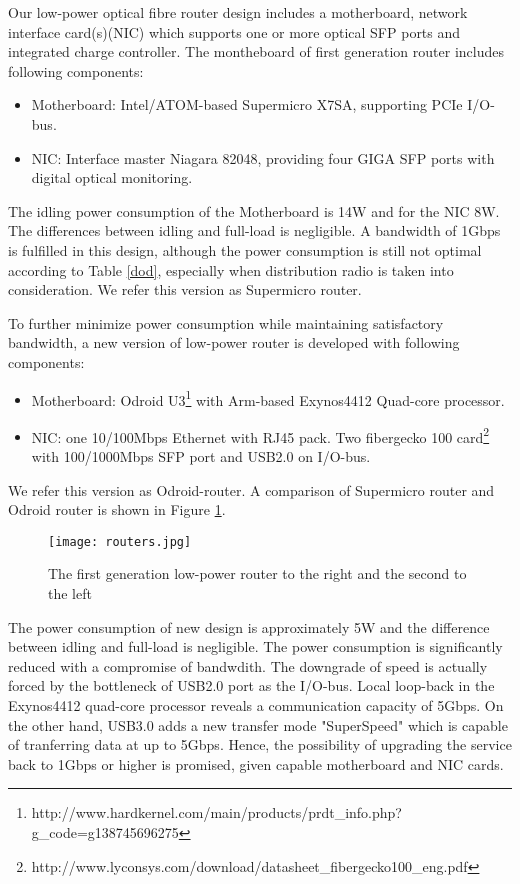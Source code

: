 Our low-power optical fibre router design includes a motherboard, network interface card(s)(NIC) which supports one or more optical SFP ports and integrated charge controller. The montheboard of first generation router includes following components:
\begin{itemize}
\item Motherboard: Intel/ATOM-based Supermicro X7SA, supporting PCIe I/O-bus.
\item NIC: Interface master Niagara 82048, providing four GIGA SFP ports with digital optical monitoring.
\end{itemize}
The idling power consumption of the Motherboard is 14W and for the NIC 8W. The differences between idling and full-load is negligible. A bandwidth of 1Gbps is fulfilled in this design, although the power consumption is still not optimal according to Table \ref{dod}, especially when distribution radio is taken into consideration. We refer this version as Supermicro router.

To further minimize power consumption while maintaining satisfactory bandwidth, a new version of low-power router is developed with following components:
\begin{itemize}
\item Motherboard: Odroid U3\footnote{http://www.hardkernel.com/main/products/prdt\_info.php?g\_code=g138745696275} with Arm-based Exynos4412 Quad-core processor.
\item NIC: one 10/100Mbps Ethernet with RJ45 pack. Two fibergecko 100 card\footnote{http://www.lyconsys.com/download/datasheet\_fibergecko100\_eng.pdf} with 100/1000Mbps SFP port and USB2.0 on I/O-bus.
\end{itemize}
We refer this version as Odroid-router. A comparison of Supermicro router and Odroid router is shown in Figure \ref{routers}.

\begin{figure}[htbp]
\centering
\texttt{[image: routers.jpg]}
\caption{The first generation low-power router to the right and the second to the left}
\label{routers}
\end{figure}

The power consumption of new design is approximately 5W and the difference between idling and full-load is negligible. The power consumption is significantly reduced with a compromise of bandwdith. The downgrade of speed is actually forced by the bottleneck of USB2.0 port as the I/O-bus. Local loop-back in the Exynos4412 quad-core processor reveals a communication capacity of 5Gbps. On the other hand, USB3.0 adds a new transfer mode "SuperSpeed" which is capable of tranferring data at up to 5Gbps. Hence, the possibility of upgrading the service back to 1Gbps or higher is promised, given capable motherboard and NIC cards.

